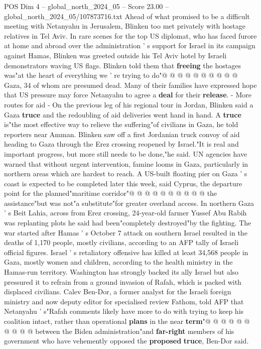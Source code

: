 \begin{textsample}{POS Dim 4 – global\_north\_2024\_05 – Score 23.00 – global\_north\_2024\_05/107873716.txt}
Ahead of what promised to be a difficult meeting with Netanyahu in Jerusalem, Blinken too met privately with hostage relatives in Tel Aviv.
In rare scenes for the top US diplomat, who has faced furore at home and abroad over the administration ' s support for Israel in its campaign against Hamas, Blinken was greeted outside his Tel Aviv hotel by Israeli demonstrators waving US flags.
Blinken told them that \textbf{freeing} the hostages was"at the heart of everything we ' re trying to do"@ @ @ @ @ @ @ @ @ @ Gaza, 34 of whom are presumed dead.
Many of their families have expressed hope that US pressure may force Netanyahu to agree a \textbf{deal} for their \textbf{release}. - More routes for aid - On the previous leg of his regional tour in Jordan, Blinken said a Gaza \textbf{truce} and the redoubling of aid deliveries went hand in hand.
A \textbf{truce} is"the most effective way to relieve the suffering"of civilians in Gaza, he told reporters near Amman.
Blinken saw off a first Jordanian truck convoy of aid heading to Gaza through the Erez crossing reopened by Israel."It is real and important progress, but more still needs to be done,"he said.
UN agencies have warned that without urgent intervention, famine looms in Gaza, particularly in northern areas which are hardest to reach.
A US-built floating pier on Gaza ' s coast is expected to be completed later this week, said Cyprus, the departure point for the planned"maritime corridor"@ @ @ @ @ @ @ @ @ @ the assistance"but was not"a substitute"for greater overland access.
In northern Gaza ' s Beit Lahia, across from Erez crossing, 24-year-old farmer Yussef Abu Rabih was replanting plots he said had been"completely destroyed"by the fighting.
The war started after Hamas ' s October 7 attack on southern Israel resulted in the deaths of 1,170 people, mostly civilians, according to an AFP tally of Israeli official figures.
Israel ' s retaliatory offensive has killed at least 34,568 people in Gaza, mostly women and children, according to the health ministry in the Hamas-run territory.
Washington has strongly backed its ally Israel but also pressured it to refrain from a ground invasion of Rafah, which is packed with displaced civilians.
Calev Ben-Dor, a former analyst for the Israeli foreign ministry and now deputy editor for specialised review Fathom, told AFP that Netanyahu ' s"Rafah comments likely have more to do with trying to keep his coalition intact, rather than operational \textbf{plans} in the near \textbf{term}"@ @ @ @ @ @ @ @ @ @ between the Biden administration"and \textbf{far-right} members of his government who have vehemently opposed the \textbf{proposed} \textbf{truce}, Ben-Dor said.

\end{textsample}
